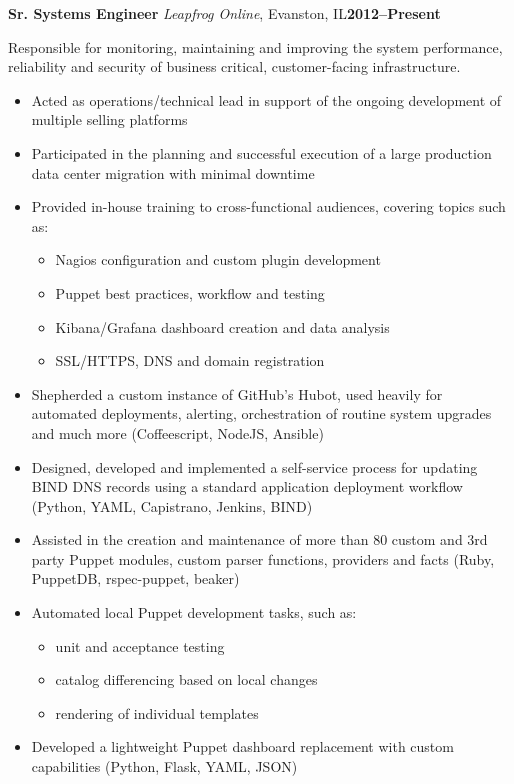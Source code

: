 \documentclass[10pt,letterpaper]{article}
\newcommand{\cventry}[5]{%
{\bfseries{#2}} {\small{\textit{#3}, #4}}\hfill {\small\bfseries{#1}}
\begin{small}\begin{adjustwidth}{1em}{2em}{\raggedright{#5}}\end{adjustwidth}\end{small}
}
\begin{document}
\cventry{2012--Present}{Sr. Systems Engineer}{Leapfrog Online}{Evanston, IL}{%
{Responsible for monitoring, maintaining and improving the system performance,
reliability and security of business critical, customer-facing infrastructure.}

\begin{itemize}
\item Acted as operations/technical lead in support of the ongoing
      development of multiple selling platforms
\item Participated in the planning and successful execution of a large
      production data center migration with minimal downtime
\item Provided in-house training to cross-functional audiences, covering
      topics such as:
\begin{itemize}
  \item Nagios configuration and custom plugin development
  \item Puppet best practices, workflow and testing
  \item Kibana/Grafana dashboard creation and data analysis
  \item SSL/HTTPS, DNS and domain registration
\end{itemize}
\item Shepherded a custom instance of GitHub's Hubot, used heavily for
      automated deployments, alerting, orchestration of routine system
      upgrades and much more (Coffeescript, NodeJS, Ansible)
\item Designed, developed and implemented a self-service process for updating
      BIND DNS records using a standard application deployment workflow (Python,
      YAML, Capistrano, Jenkins, BIND)
\item Assisted in the creation and maintenance of more than 80 custom and 3rd
      party Puppet modules, custom parser functions, providers and facts (Ruby,
      PuppetDB, rspec-puppet, beaker)
\item Automated local Puppet development tasks, such as:
  \begin{itemize}
    \item unit and acceptance testing
    \item catalog differencing based on local changes
    \item rendering of individual templates
  \end{itemize}
\item Developed a lightweight Puppet dashboard replacement with custom
      capabilities (Python, Flask, YAML, JSON)

\end{itemize}}
\end{document}

